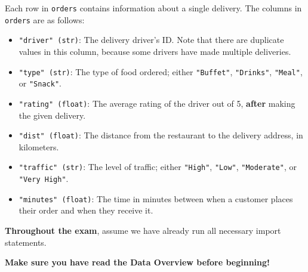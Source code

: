 \documentclass[twoside,12pt]{article}
\begin{document}
\noindent Each row in \texttt{orders} contains information about a single delivery. The columns in \texttt{orders} are as follows:

\begin{itemize}

\item \texttt{"driver" (str)}: The delivery driver's ID. Note that there are duplicate values in this column, because some drivers have made multiple deliveries.
\item \texttt{"type" (str)}: The type of food ordered; either \texttt{"Buffet"}, \texttt{"Drinks"}, \texttt{"Meal"}, or \texttt{"Snack"}.
\item \texttt{"rating" (float)}: The average rating of the driver out of 5, \textbf{after} making the given delivery.
\item \texttt{"dist" (float)}: The distance from the restaurant to the delivery address, in kilometers.
\item \texttt{"traffic" (str)}: The level of traffic; either \texttt{"High"}, \texttt{"Low"}, \texttt{"Moderate"}, or \texttt{"Very High"}.
\item \texttt{"minutes" (float)}: The time in minutes between when a customer places their order and when they receive it.

\end{itemize}

\noindent \textbf{Throughout the exam}, assume we have already run all necessary import statements.

\newpage

\noindent \textbf{Make sure you have read the Data Overview before beginning!}
\end{document}
